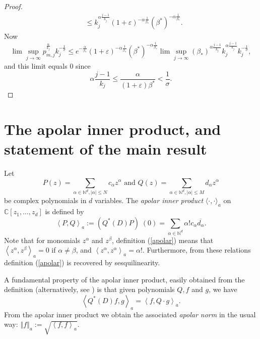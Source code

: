 \documentclass[12pt]{amsart}
\begin{document}
\begin{proof}
\begin{align*}
		&  \leq k_{j}^{\alpha\frac{j-1}{k_{j}}}\left(  1+\varepsilon\right)
		^{-\alpha\frac{1}{\beta_{\ast}}}\left(  \beta^{\ast}\right)  ^{-\alpha\frac
			{1}{\beta_{\ast}}}.
	\end{align*}
	Now
	\[
	\lim\sup_{j\rightarrow\infty}p_{m,j}^{\frac{\alpha}{k_{j}}}k_{j}^{-\frac{1}{\sigma}
	}
	\leq 
	e^{-\frac{\alpha}{\beta_{\ast}}}\left(  1+\varepsilon\right)
	^{-\alpha\frac{1}{\beta_{\ast}}}\left(  \beta^{\ast}\right)  ^{-\alpha\frac
		{1}{\beta_{\ast}}}
	\lim\sup_{j\rightarrow\infty}
	\left(  \beta_{\ast}\right)^{\alpha
		\frac{j-1}{k_{j}}}
	k_{j}^{\alpha\frac{j-1}{k_{j}}
	}k_{j}^{-\frac{1}{\sigma}},
	\]
	and this limit equals $0$ since
	\[
	\alpha\frac{j-1}{k_{j}}
	\leq
	\frac{\alpha}{\left(
		1+\varepsilon\right)  \beta^{\ast}}
	< \frac{1}{\sigma}.
	\]
	\end{proof}

\section{The apolar inner product, and statement of the main result}

Let
\[
P\left(  z\right)  =\sum_{\alpha\in\mathbb{N}^{d},\left\vert
\alpha\right\vert \leq N}c_{\alpha}z^{\alpha}\text{ and }Q\left(  z\right)
=\sum_{\alpha\in\mathbb{N}^{d},\left\vert \alpha\right\vert \leq
M}d_{\alpha}z^{\alpha}
\] be complex polynomials in $d$ variables.
The \emph{apolar inner product} $\langle\cdot,\cdot\rangle_{a}$ on
$\mathbb{C}[z_{1},\dots,z_{d}]$ is defined by
\begin{equation}
	\label{apolar}\left\langle P,Q\right\rangle _{a} :=\left(  Q^{*}\left(
	D\right)  P\right)  \;(0)=\sum_{\alpha\in\mathbb{N}^{d}}\alpha!c_{\alpha
	}\overline{d_{\alpha}}.
\end{equation}
Note that for monomials $z^{\alpha}$ and $z^{\beta}$, definition
(\ref{apolar}) means that $\left\langle z^{\alpha}, z^{\beta}\right\rangle
_{a} = 0$ if $\alpha\ne\beta$, and $\left\langle z^{\alpha}, z^{\alpha
}\right\rangle _{a} = \alpha!$. Furthermore, from these relations definition
(\ref{apolar}) is recovered by sesquilinearity.

A fundamental property of the apolar inner product, easily obtained from the
definition (alternatively, see \cite[Proposition 3]{AlRe23}) is that given
polynomials $Q, f$ and $g$, we have
\begin{equation}
	\left\langle Q^{\ast}\left(  D\right)  f,g\right\rangle _{a}=\left\langle
	f,Q\cdot g\right\rangle _{a} . \label{eqFischeradjoint}%
\end{equation}
From the apolar inner product we obtain the associated \emph{apolar norm} in
the usual way: $\left\Vert f\right\Vert _{a} := \sqrt{\left\langle
	f,f\right\rangle _{a}}. $
\end{document}
